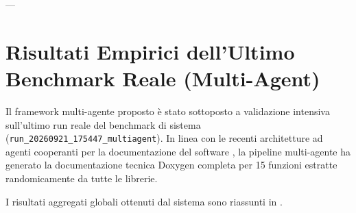 ---

\section{Risultati Empirici dell'Ultimo Benchmark Reale (Multi-Agent)}
\label{sec:risultati_benchmark_reale}

Il framework multi-agente proposto è stato sottoposto a validazione intensiva sull'ultimo run reale del benchmark di sistema (\texttt{run\_20260921\_175447\_multiagent}). In linea con le recenti architetture ad agenti cooperanti per la documentazione del software \cite{luo_repoagent_2024,yang_docagent_2025,hoang_codewiki_2026}, la pipeline multi-agente ha generato la documentazione tecnica Doxygen completa per 15 funzioni estratte randomicamente da tutte le librerie. 

I risultati aggregati globali ottenuti dal sistema sono riassunti in .

